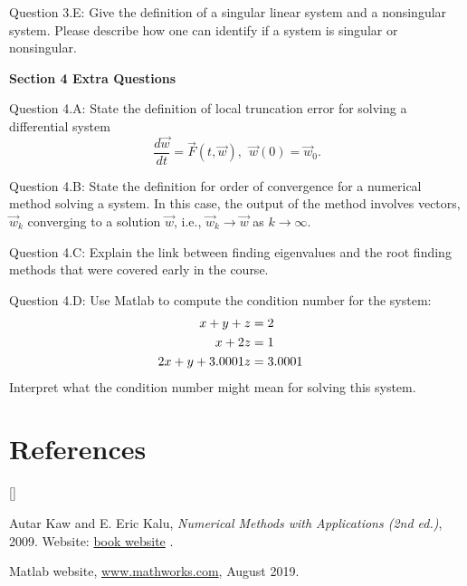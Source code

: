 \documentclass{article}
\def\beginrefs{\begin{list}%
        {[\arabic{equation}]}{\usecounter{equation}
         \setlength{\leftmargin}{2.0truecm}\setlength{\labelsep}{0.4truecm}%
         \setlength{\labelwidth}{1.6truecm}}}
\def\endrefs{\end{list}}
\def\bibentry#1{\item[\hbox{[#1]}]}
\def\ds{\displaystyle}
\begin{document}
\par \medskip \noindent 
%
Question 3.E: Give the definition of a singular linear system and a nonsingular system. Please describe how one can identify if a system is singular or nonsingular. 
%
\par \bigskip \noindent 
{\bf Section 4 Extra Questions}\\
\par \medskip \noindent 
Question 4.A: State the definition of local truncation error for solving a differential system
$$\frac {d\vec w}{dt} = \vec F(t,\vec w), \ \ \vec w(0)=\vec w_0.$$
\par \medskip \noindent 
Question 4.B: State the definition for order of convergence for a numerical method solving a system. In this case, the output of the method involves vectors, $\ds \vec w_k$ converging to a solution $\ds \vec w$, i.e., $\ds \vec w_k \rightarrow \vec w$ as $k\rightarrow \infty$.
\par \medskip \noindent 
Question 4.C: Explain the link between finding eigenvalues and the root finding methods that were covered early in the course. 
\par \medskip \noindent 
Question 4.D: Use Matlab to compute the condition number for the system:
\begin{align*}
    x + y + z &= 2\cr 
    x + 2z  &= 1 \cr
    2x + y + 3.0001z &= 3.0001
\end{align*}
Interpret what the condition number might mean for solving this system. 

\section*{References}
\beginrefs

\bibentry{KK09} {\sc Autar Kaw} and {\sc E. Eric Kalu}, {\it Numerical Methods with Applications (2nd ed.)}, 2009. Website: \href{http://autarkaw.com/books/numericalmethods/index.html}{book website} .

\bibentry{Matlab} {\sc Matlab website}, \href{https://www.mathworks.com}{www.mathworks.com}, August 2019. %

\endrefs
\end{document}
